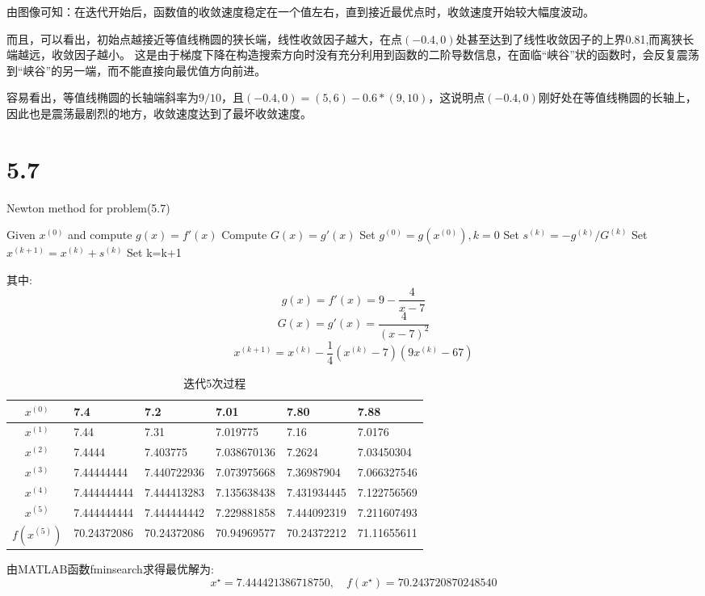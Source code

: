 由图像可知：在迭代开始后，函数值的收敛速度稳定在一个值左右，直到接近最优点时，收敛速度开始较大幅度波动。

而且，可以看出，初始点越接近等值线椭圆的狭长端，线性收敛因子越大，在点$(-0.4,0)$处甚至达到了线性收敛因子的上界0.81,而离狭长端越远，收敛因子越小。
这是由于梯度下降在构造搜索方向时没有充分利用到函数的二阶导数信息，在面临“峡谷”状的函数时，会反复震荡到“峡谷”的另一端，而不能直接向最优值方向前进。

容易看出，等值线椭圆的长轴端斜率为$9/10$，且$(-0.4,0)=(5,6)-0.6*(9,10)$，这说明点$(-0.4,0)$刚好处在等值线椭圆的长轴上，因此也是震荡最剧烈的地方，收敛速度达到了最坏收敛速度。


\section{5.7}

\begin{algorithm}[h]  
\caption{Newton method for problem(5.7)}  
\begin{algorithmic}[1]  
\STATE Given $x^{(0)}$ and compute $g(x)=f'(x)$
\STATE Compute $G(x)=g'(x)$
\STATE Set $g^{(0)}=g(x^{(0)}),k=0$
\STATE Set $s^{(k)}=-g^{(k)}/G^{(k)}$
\STATE Set $x^{(k+1)}=x^{(k)}+s^{(k)}$
\STATE Set k=k+1
\ENDWHILE
\end{algorithmic}  
\end{algorithm}  

其中:\[g(x)=f'(x)=9-\dfrac{4}{x-7}\]
\[G(x)=g'(x)=\dfrac{4}{(x-7)^2}\]
\[x^{(k+1)}=x^{(k)}-\dfrac{1}{4}(x^{(k)}-7)(9x^{(k)}-67)\]

\begin{table}[htbp]
  \centering
  \caption{迭代5次过程}
    \begin{tabular}{clllll}
\toprule
  $x^{(0)}$&7.4  & 7.2  & 7.01 &7.80  & 7.88 \\
	\midrule
   $x^{(1)}$& 7.44  & 7.31  & 7.019775 & 7.16  & 7.0176 \\
    $x^{(2)}$&7.4444 & 7.403775 & 7.038670136 & 7.2624 & 7.03450304 \\
    $x^{(3)}$&7.44444444 & 7.440722936 & 7.073975668 & 7.36987904 & 7.066327546 \\
   $ x^{(4)}$&7.444444444 & 7.444413283 & 7.135638438 & 7.431934445 & 7.122756569 \\
    $x^{(5)}$&7.444444444 & 7.444444442 & 7.229881858 & 7.444092319 & 7.211607493 \\
	\midrule
    $f(x^{(5)})$&70.24372086 & 70.24372086 & 70.94969577 & 70.24372212 & 71.11655611 \\
	\bottomrule
    \end{tabular}%
  \label{tab:addlabel}%
\end{table}%
由MATLAB函数fminsearch求得最优解为:\[x^{\star}=7.444421386718750,\quad f(x^{\star})=70.243720870248540\]

